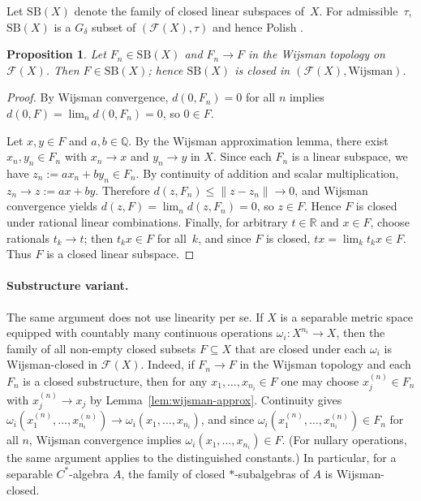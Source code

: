\documentclass[12pt,fleqn,a4paper]{amsart}
\renewcommand{\le}{\leqslant}
\numberwithin{equation}{section}
\newtheorem{proposition}[theorem]{Proposition}
\theoremstyle{definition}
\newcommand{\Q}{\mathbb{Q}}
\newcommand{\R}{\mathbb{R}}
\newcommand{\SB}{\mathrm{SB}}
\begin{document}
Let $\SB(X)$ denote the family of closed linear subspaces of~$X$.  For admissible~$\tau$,
$\SB(X)$ is a $G_\delta$ subset of $(\mathscr F(X),\tau)$ and hence Polish
\cite{GodefroySaintRaymond2018}.

\begin{proposition}
\label{prop:SBX-Wijsman-closed}
Let $F_n\in\SB(X)$ and $F_n\to F$ in the Wijsman topology on $\mathscr F(X)$.
Then $F\in\SB(X)$; hence $\SB(X)$ is closed in $(\mathscr F(X),\mathrm{Wijsman})$.
\end{proposition}

\begin{proof}
By Wijsman convergence, $d(0,F_n)=0$ for all $n$ implies $d(0,F)=\lim_n d(0,F_n)=0$,
so $0\in F$.

Let $x,y\in F$ and $a,b\in\Q$.  By the Wijsman approximation lemma, there exist
$x_n,y_n\in F_n$ with $x_n\to x$ and $y_n\to y$ in $X$.
Since each $F_n$ is a linear subspace, we have $z_n:=ax_n+by_n\in F_n$.
By continuity of addition and scalar multiplication, $z_n\to z:=ax+by$.
Therefore $d(z,F_n)\le \|z-z_n\|\to 0$,
and Wijsman convergence yields
$d(z,F)=\lim_n d(z,F_n)=0$, so $z\in F$.
Hence $F$ is closed under rational linear combinations.
Finally, for arbitrary $t\in\R$ and $x\in F$, choose rationals $t_k\to t$;
then $t_k x\in F$ for all~$k$, and since $F$ is closed, $tx=\lim_k t_k x\in F$.
Thus $F$ is a closed linear subspace.
\end{proof}

\paragraph{Substructure variant.}
The same argument does not use linearity per se.  If $X$ is a separable metric
space equipped with countably many continuous operations
$\omega_i:X^{n_i}\to X$, then the family of all non-empty closed subsets
$F\subseteq X$ that are closed under each $\omega_i$ is Wijsman-closed in
$\mathscr F(X)$.  Indeed, if $F_n\to F$ in the Wijsman topology and each $F_n$
is a closed substructure, then for any $x_1,\dots,x_{n_i}\in F$ one may choose
$x_j^{(n)}\in F_n$ with $x_j^{(n)}\to x_j$ by
Lemma~\ref{lem:wijsman-approx}.  Continuity gives
$\omega_i(x_1^{(n)},\dots,x_{n_i}^{(n)})\to \omega_i(x_1,\dots,x_{n_i})$, and since
$\omega_i(x_1^{(n)},\dots,x_{n_i}^{(n)})\in F_n$ for all $n$, Wijsman convergence
implies $\omega_i(x_1,\dots,x_{n_i})\in F$.  (For nullary operations, the same
argument applies to the distinguished constants.)  In particular, for a separable
$C^*$-algebra $A$, the family of closed $*$-subalgebras of $A$ is Wijsman-closed.
\end{document}
